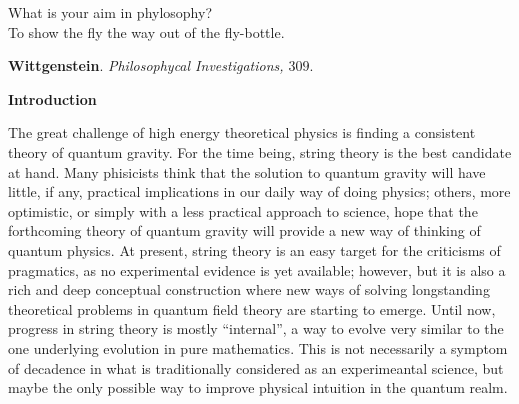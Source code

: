 \tableofcontents

\pagebreak



\begin{flushright}
What is your aim in phylosophy? \\
To show the fly the way out of the fly-bottle.
  
\vspace{4 mm}
  
{\bf Wittgenstein}. {\em Philosophycal Investigations, $309$}.

\end{flushright}


  
\vspace{30 mm}
  


{\large {\bf Introduction}}
  
\vspace{10 mm}
  


The great challenge of high energy theoretical physics is finding
a consistent theory of quantum gravity. For the time being,
string theory is the best candidate at hand. Many phisicists
think that the solution to quantum gravity will have little, if
any, practical implications in our daily way of doing physics;
others, more optimistic, or simply with a less practical approach
to science, hope that the forthcoming theory of quantum gravity
will provide a new way of thinking of quantum physics.
At present, string theory is an easy target for the criticisms of
pragmatics, as no experimental evidence is yet available; however, but it is
also a rich and deep conceptual construction where new ways of
solving longstanding theoretical problems in quantum field theory
are starting to emerge. Until now, progress in string theory is
mostly ``internal'', a way to evolve very similar to the one
underlying evolution in pure mathematics. This is not
necessarily a symptom of decadence in what is traditionally
considered as an experimeantal science, but maybe the only
possible way to improve physical intuition in the quantum realm.  
  
